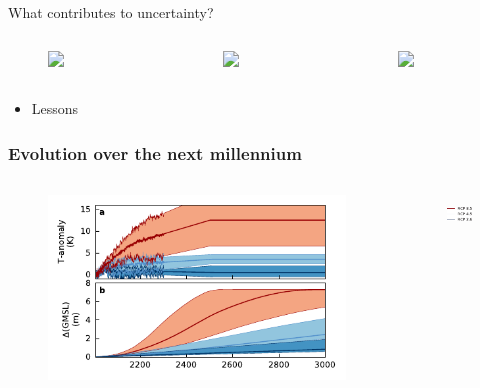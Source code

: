 \documentclass[hide notes,intlimits]{beamer}
\begin{document}
\begin{frame}{What contributes to uncertainty?}
  \begin{columns}[c]
    \begin{column}{.32\linewidth}
      \begin{figure}
        \includegraphics<1>[width=\textwidth]{sobel_ts_26}
      \end{figure}
    \end{column}
    \begin{column}{.32\linewidth}
      \begin{figure}
        \includegraphics<1>[width=\textwidth]{sobel_ts_45}
      \end{figure}
    \end{column}
    \begin{column}{.32\linewidth}
      \begin{figure}
        \includegraphics<1>[width=\textwidth]{sobel_ts_85}
      \end{figure}
    \end{column}
  \end{columns}
  \begin{itemize}
  \item Lessons
\end{itemize}
\end{frame}

\begin{frame}
  \frametitle{Evolution over the next millennium}
  \begin{columns}[c]
    \begin{column}{.85\linewidth}
    \begin{figure}
    \includegraphics[width=\textwidth]{les18_les}
    \end{figure}
    \end{column}
    \begin{column}{.15\linewidth}
      \begin{figure}
        \includegraphics[height=1cm]{legend-rcp}
      \end{figure}
    \end{column}
  \end{columns}
\end{frame}
\end{document}

